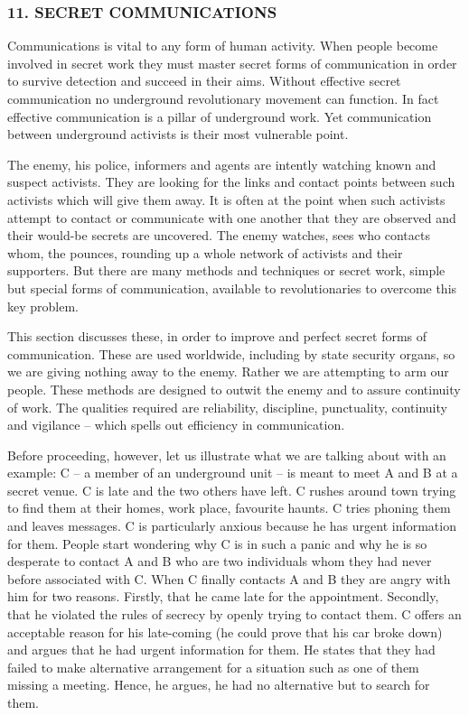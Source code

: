 \subsubsection{11. SECRET COMMUNICATIONS}

Communications is vital to any form of human activity. When people
become involved in secret work they must master secret forms of
communication in order to survive detection and succeed in their aims.
Without effective secret communication no underground revolutionary
movement can function. In fact effective communication is a pillar of
underground work. Yet communication between underground activists is
their most vulnerable point.

The enemy, his police, informers and agents are intently watching known
and suspect activists. They are looking for the links and contact points
between such activists which will give them away. It is often at the
point when such activists attempt to contact or communicate with one
another that they are observed and their would-be secrets are uncovered.
The enemy watches, sees who contacts whom, the pounces, rounding up a
whole network of activists and their supporters. But there are many
methods and techniques or secret work, simple but special forms of
communication, available to revolutionaries to overcome this key
problem.

This section discusses these, in order to improve and perfect secret
forms of communication. These are used worldwide, including by state
security organs, so we are giving nothing away to the enemy. Rather we
are attempting to arm our people. These methods are designed to outwit
the enemy and to assure continuity of work. The qualities required are
reliability, discipline, punctuality, continuity and vigilance -- which
spells out efficiency in communication.

Before proceeding, however, let us illustrate what we are talking about
with an example: C -- a member of an underground unit -- is meant to
meet A and B at a secret venue. C is late and the two others have left.
C rushes around town trying to find them at their homes, work place,
favourite haunts. C tries phoning them and leaves messages. C is
particularly anxious because he has urgent information for them. People
start wondering why C is in such a panic and why he is so desperate to
contact A and B who are two individuals whom they had never before
associated with C. When C finally contacts A and B they are angry with
him for two reasons. Firstly, that he came late for the appointment.
Secondly, that he violated the rules of secrecy by openly trying to
contact them. C offers an acceptable reason for his late-coming (he
could prove that his car broke down) and argues that he had urgent
information for them. He states that they had failed to make alternative
arrangement for a situation such as one of them missing a meeting.
Hence, he argues, he had no alternative but to search for them.

